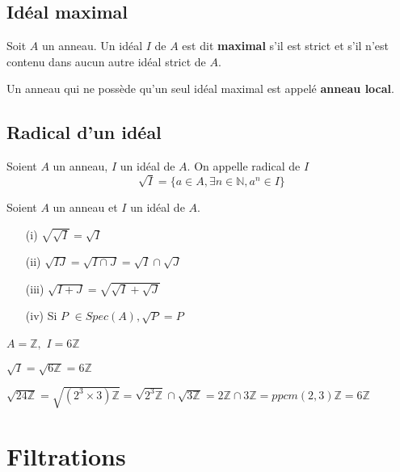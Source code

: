\subsection{Idéal maximal}
\begin{madefinition}
	Soit $A$ un anneau. Un idéal $I$ de $A$ est dit \textbf{maximal} s'il est strict et s'il n'est contenu dans aucun autre idéal strict de $A$.
\end{madefinition}
\begin{maremarque}
	Un anneau qui ne possède qu'un seul idéal maximal est appelé \textbf{anneau local}.
\end{maremarque}
\subsection{Radical d'un idéal}
\begin{madefinition}
	Soient $A$ un anneau, $I$ un idéal de $A$. On appelle radical de $I$
	\[\sqrt[]{I} = \{ a \in A, \exists n \in \mathbb{N}, a^n \in I \} \]
\end{madefinition}
\begin{maproposition}
	Soient $A$ un anneau et $I$ un idéal de $A$.
	\begin{enumerate}
		\item[(i)] $\sqrt{\sqrt{I}}=\sqrt{I}$
		
		\item[(ii)] $\sqrt{IJ}=\sqrt{I\cap J}=\sqrt{I}\cap \sqrt{J}$
		
		\item[(iii)] $\sqrt{I+J}=\sqrt{\sqrt{I}+\sqrt{J}}$
		
		\item[(iv)] Si $P$ $\in Spec(A),\sqrt{P}=P$
	\end{enumerate}
\end{maproposition}
\begin{monexemple}
	$A=\mathbb{Z},$ $I=6\mathbb{Z}$
	
	$\sqrt{I}=\sqrt{6\mathbb{Z}}=6\mathbb{Z}$
	
	$\sqrt{24\mathbb{Z}}=\sqrt{(2^{3}\times 3)\mathbb{Z}}=\sqrt{2^{3}\mathbb{Z}}\cap \sqrt{3\mathbb{Z}}=2\mathbb{Z}\cap 3\mathbb{Z}=ppcm(2,3)\mathbb{Z}=6\mathbb{Z}$
\end{monexemple}
\section{Filtrations}
